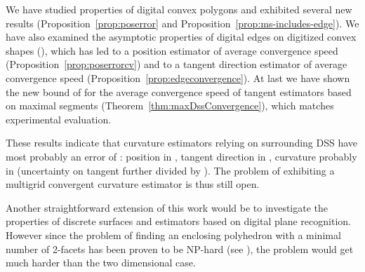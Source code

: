 \documentclass{llncs}
\newcommand{\refProposition}[1]{Proposition~\ref{#1}}
\newcommand{\refTheorem}[1]{Theorem~\ref{#1}}
\begin{document}
We have studied properties of digital convex polygons and
exhibited several new results (\refProposition{prop:poserror} and
\refProposition{prop:ms-includes-edge}). We have also examined the
asymptotic properties of digital edges on digitized convex shapes
(), which has led to a position
estimator of average convergence speed 
(\refProposition{prop:poserrorcv}) and to a tangent direction
estimator of average convergence speed 
(\refProposition{prop:edgeconvergence}). At last we have shown the new
bound of  for the average convergence speed of
tangent estimators based on maximal segments
(\refTheorem{thm:maxDssConvergence}), which matches experimental
evaluation.

These results indicate that curvature estimators relying on
surrounding DSS have most probably an error of : position
 in , tangent direction  in , curvature  probably in
 (uncertainty on tangent further divided by
). The problem of exhibiting a multigrid
convergent curvature estimator is thus still open. 

Another straightforward extension of this work would be to investigate
the properties of discrete surfaces and estimators based on digital
plane recognition. However since the problem of finding an enclosing
polyhedron with a minimal number of 2-facets has been proven to be
NP-hard (see \cite{Brimkov06}), the problem would get much harder than the 
two dimensional case.






 
\end{document}
